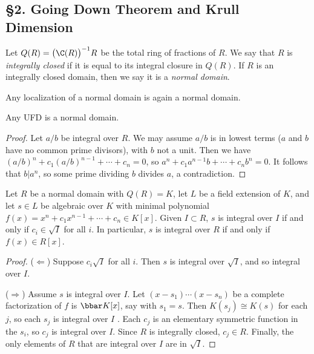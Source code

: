  \subsection{\S 2. Going Down Theorem and Krull Dimension}
 \begin{definition}
   Let $Q(R) = \bigl(\C(R)\bigr)^{-1} R$ be the total ring of fractions of $R$. We say
   that $R$ is \emph{integrally closed} if it is equal to its integral closure in $Q(R)$.
   If $R$ is an integrally closed domain, then we say it is a \emph{normal domain}.
 \end{definition}
 \begin{remark}
   Any localization of a normal domain is again a normal domain.
 \end{remark}
 \begin{proposition}
   Any UFD is a normal domain.
 \end{proposition}
 \begin{proof}
   Let $a/b$ be integral over $R$. We may assume $a/b$ is in lowest terms ($a$ and $b$
   have no common prime divisors), with $b$ not a unit. Then we have
   $(a/b)^n+c_1(a/b)^{n-1}+\cdots+ c_n=0$, so $a^n+c_1 a^{n-1}b+\cdots + c_nb^n=0$. It
   follows that $b|a^n$, so some prime dividing $b$ divides $a$, a contradiction.
 \end{proof}
 \begin{lemma}
   Let $R$ be a normal domain with $Q(R)=K$, let $L$ be a field extension of $K$, and let
   $s\in L$ be algebraic over $K$ with minimal polynomial $f(x)=x^n+c_1x^{n-1}+\cdots
   + c_n\in K[x]$. Given $I\subset R$, $s$ is integral over $I$ if and only if $c_i\in \sqrt
   I$ for all $i$. In particular, $s$ is integral over $R$ if and only if $f(x)\in R[x]$.
 \end{lemma}
 \begin{proof}
   ($\Leftarrow$) Suppose $c_i \sqrt I$ for all $i$. Then $s$ is integral over $\sqrt I$,
   and so integral over $I$.

   ($\Rightarrow$) Assume $s$ is integral over $I$. Let $(x-s_1)\cdots (x-s_n)$ be a
   complete factorization of $f$ is $\bbar K[x]$, say with $s_1=s$. Then $K(s_j)\cong
   K(s)$ for each $j$, so each $s_j$ is integral over $I$ . Each $c_j$ is an elementary symmetric
   function in the $s_i$, so $c_j$ is integral over $I$. Since $R$ is integrally closed,
   $c_j\in R$. Finally, the only elements of $R$ that are integral over $I$ are in $\sqrt
   I$.
 \end{proof}
 \setcounter{lecture}{25}
